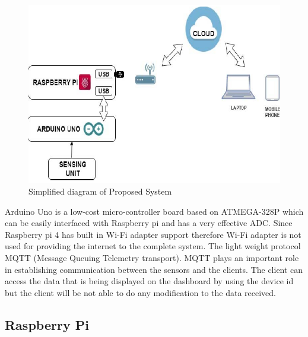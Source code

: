 \begin{figure}[!ht]
\centering
\includegraphics[scale=0.7]{figures/design}
\caption{\label{img31} Simplified diagram of Proposed System}
\end{figure}

Arduino Uno is a low-cost micro-controller board based on
ATMEGA-328P which can be easily interfaced with
Raspberry pi and has a very effective ADC. Since Raspberry
pi 4 has built in Wi-Fi adapter support therefore
Wi-Fi adapter is not used for providing the internet to the
complete system. The light weight protocol MQTT (Message
Queuing Telemetry transport). MQTT plays an important role
in establishing communication between the sensors and the
clients. The client can access the data that is being displayed
on the dashboard by using the device id but the client will be
not able to do any modification to the data received.

\subsection{Raspberry Pi}

